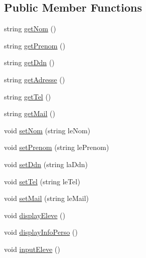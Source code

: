 \subsection*{Public Member Functions}
\begin{DoxyCompactItemize}
\item 
string \hyperlink{class_eleve_abf63239397983c10c4dfea36839aa522}{get\+Nom} ()
\item 
string \hyperlink{class_eleve_a306ededf39fac45344ceb81f4591d96f}{get\+Prenom} ()
\item 
string \hyperlink{class_eleve_a763cd01d1dd01ab767993af4cddd2287}{get\+Ddn} ()
\item 
string \hyperlink{class_eleve_a6e116a71d9ff92a800924bb007071695}{get\+Adresse} ()
\item 
string \hyperlink{class_eleve_a654c5306631f47e2935d6bb824103dad}{get\+Tel} ()
\item 
string \hyperlink{class_eleve_acc6dd85cc1a1772ec64452d4de335c75}{get\+Mail} ()
\item 
void \hyperlink{class_eleve_a020452a09dac3e0c71f733ab6076ad26}{set\+Nom} (string le\+Nom)
\item 
void \hyperlink{class_eleve_a680c0bc086177e18c058347f88e76919}{set\+Prenom} (string le\+Prenom)
\item 
void \hyperlink{class_eleve_aa59d7a77676c74d319fc192b052db3be}{set\+Ddn} (string la\+Ddn)
\item 
void \hyperlink{class_eleve_a5551f7974770c2a532d460e90707a8ec}{set\+Tel} (string le\+Tel)
\item 
void \hyperlink{class_eleve_aa7fe74f0d1328aae34effbbf465b4173}{set\+Mail} (string le\+Mail)
\item 
void \hyperlink{class_eleve_a8c7b5d6cdec71c14fc4f05d669d3e7d4}{display\+Eleve} ()
\item 
void \hyperlink{class_eleve_a6fff5d0f8829381a5623384b0f4b0791}{display\+Info\+Perso} ()
\item 
void \hyperlink{class_eleve_ab2ee2e1f243c9ebfeca5c21852874b8f}{input\+Eleve} ()
\end{DoxyCompactItemize}
